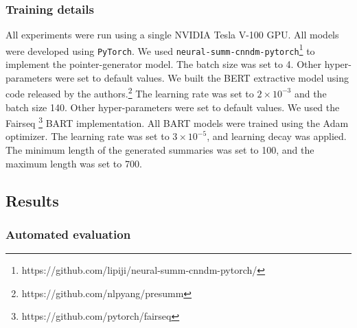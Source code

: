 \documentclass[letterpaper, table]{article} %
\begin{document}
\subsubsection{Training details}
All experiments were run using a single NVIDIA Tesla V-100 GPU. All models were developed using \texttt{PyTorch}.
We used \texttt{neural-summ-cnndm-pytorch}\footnote{https://github.com/lipiji/neural-summ-cnndm-pytorch/} to implement the pointer-generator model. The batch size was set to 4. Other hyper-parameters were set to default values. We built the BERT extractive model using code released by the authors.\footnote{https://github.com/nlpyang/presumm}
The learning rate was set to $2 \times 10^{-3}$ and the batch size 140. Other hyper-parameters were set to default values. We used the Fairseq \footnote{https://github.com/pytorch/fairseq} BART implementation. All BART models were trained using the Adam optimizer. The learning rate was set to $3 \times 10^{-5}$, and learning decay was applied. The minimum length of the generated summaries was set to 100, and the maximum length was set to 700.
\subsection{Results}
\subsubsection{Automated evaluation}
\end{document}
